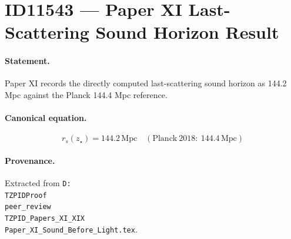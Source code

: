 \section*{ID11543 --- Paper XI Last-Scattering Sound Horizon Result}

\paragraph{Statement.}
Paper XI records the directly computed last-scattering sound horizon as 144.2 Mpc against the Planck 144.4 Mpc reference.

\paragraph{Canonical equation.}
\[
r_s(z_\star)=144.2\,\mathrm{Mpc}\quad(\mathrm{Planck}\ 2018:\ 144.4\,\mathrm{Mpc})
\]

\paragraph{Provenance.}
Extracted from \texttt{D:\\TZPIDProof\\peer\_review\\TZPID\_Papers\_XI\_XIX\\Paper\_XI\_Sound\_Before\_Light.tex}.
